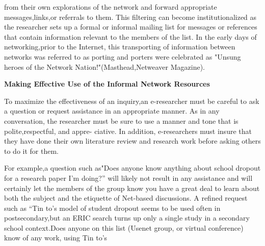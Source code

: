 \documentclass[8pt]{beamer}
\begin{document}
\begin{frame}
from their own explorations of the network and forward appropriate messages,links,or referrals to them. 
This filtering can become institutionalized as the researcher sets up a formal or informal mailing list for messages or references that contain information relevant to the members of the list. In the early days of networking,prior to the
Internet, this transporting of information between networks was referred to as porting and porters were celebrated as "Unsung heroes of the Network Nation!"(Masthead,Netweaver Magazine).

\vspace{3mm}
\hspace{-1cm}
\textbf{Making Effective Use of the Informal Network Resources}
\vspace{3mm}

To maximize the effectiveness of an inquiry,an e-researcher must be careful to ask a question or request assistance in an appropriate manner. As in any conversation, the researcher must be sure to use a manner and tone that is polite,respectful, and appre-
ciative. In addition, e-researchers must insure that they have done their own literature review and research work before asking others to do it for them.

For example,a question such as"Does anyone know anything about school dropout for a research paper I'm doing?” will likely not result in any assistance and will certainly let the members of the group know you have a great deal to learn about both
the subject and the etiquette of Net-based discussions. A refined request such as “Tin to's model of student dropout seems to be used often in postsecondary,but an ERIC search turns up only a single study in a secondary school context.Does anyone
on this list (Usenet group, or virtual conference) know of any work, using Tin to's
\end{frame}
\end{document}
